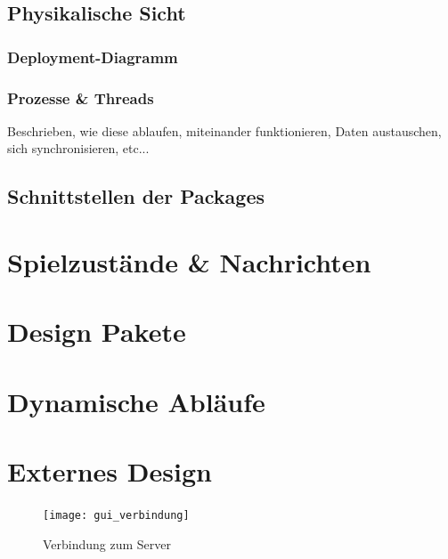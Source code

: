 \documentclass[a4paper,12pt,halfparskip,DIV12]{scrartcl}
\begin{document}

\clearpage
\subsection{Physikalische Sicht}

\subsubsection{Deployment-Diagramm}

\subsubsection{Prozesse \& Threads} %
\label{sub:prozesse_threads}
Beschrieben, wie diese ablaufen, miteinander funktionieren, Daten austauschen, sich synchronisieren, etc...

\clearpage
\subsection{Schnittstellen der Packages} %
\label{sub:schnittstellen_der_packages}

\clearpage
\section{Spielzustände \& Nachrichten} %
\label{spielzustaende_nachrichten}

\clearpage
\section{Design Pakete} %
\label{design_pakete}

\clearpage
\section{Dynamische Abläufe} %
\label{dynamische_ablauefe}

\clearpage
\section{Externes Design} %
\label{externes_design}

\begin{figure}[h]
	\centering
	\texttt{[image: gui\_verbindung]}
	\caption{Verbindung zum Server}
	\label{fig:gui_verbindung}
\end{figure}
\end{document}
